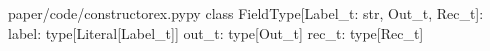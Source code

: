 \begin{fileminted}{paper/code/constructorex.py}{py}
class FieldType[Label_t: str, Out_t, Rec_t]:
    label: type[Literal[Label_t]]
    out_t: type[Out_t]
    rec_t: type[Rec_t]
\end{fileminted}
        